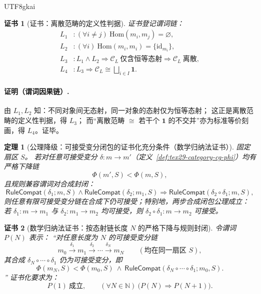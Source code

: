 \documentclass[12pt]{article}
\newtheorem{theorem}{定理}[section]
\newtheorem{Certificate}{证书}[section]
\newcommand{\NN}{\mathbb{N}}
\begin{document}
\begin{CJK*}{UTF8}{gkai}
\begin{Certificate}[证书：离散范畴的定义性判据]
\label{cert:tex29-axL-downgraded-discrete}
证书登记谓词链：
\[
\begin{aligned}
  L_1 &: (\forall i\neq j)\ \mathrm{Hom}(m_i,m_j)=\varnothing,\\
  L_2 &: (\forall i)\ \mathrm{Hom}(m_i,m_i)=\{\mathrm{id}_{m_i}\},\\
  L_3 &: L_1\wedge L_2\Rightarrow \mathcal{C}_L\ \text{仅含恒等态射}\Rightarrow \mathcal{C}_L\ \text{离散},\\
  L_4 &: L_3\Rightarrow \mathcal{C}_L\cong \bigsqcup_{i\in I}\mathbf{1}.
\end{aligned}
\]
\end{Certificate}

\paragraph{证明（谓词因果链）.}
由 $L_1,L_2$ 知：不同对象间无态射，同一对象的态射仅为恒等态射；
这正是离散范畴的定义性判据，得 $L_3$；
而“离散范畴 $\cong$ 若干个 $\mathbf{1}$ 的不交并”亦为标准等价刻画，得 $L_4$。证毕。

\begin{theorem}[公理降级：可接受变分闭包的证书化充分条件（数学归纳法证书）]
\label{thm:tex29-axG-downgraded-closure}
固定扇区 $S$。
若对任意可接受变分 $\delta:m\to m'$（定义~\ref{def:tex29-category-cg-phi}）均有严格下降链
\[
  \Phi(m',S)<\Phi(m,S),
\]
且规则兼容谓词对合成封闭：
\[
  \mathsf{RuleCompat}(\delta_1;m,S)\wedge \mathsf{RuleCompat}(\delta_2;m_1,S)
  \Rightarrow
  \mathsf{RuleCompat}(\delta_2\circ\delta_1;m,S),
\]
则任意有限可接受变分链在合成下仍可接受；特别地，两步合成闭包公理成立：
若 $\delta_1:m\to m_1$ 与 $\delta_2:m_1\to m_2$ 均可接受，则 $\delta_2\circ\delta_1:m\to m_2$ 可接受。
\end{theorem}

\begin{Certificate}[数学归纳法证书：按态射链长度 $N$ 的严格下降与规则封闭]
\label{cert:tex29-axG-downgraded-closure}
令谓词 $P(N)$ 表示：
“对任意长度为 $N$ 的可接受变分链
\[
  m_0\xrightarrow{\delta_1} m_1\xrightarrow{\delta_2}\cdots\xrightarrow{\delta_N} m_N
  \qquad(\text{均在同一扇区 }S),
\]
其合成 $\delta_N\circ\cdots\circ\delta_1$ 仍为可接受变分，即
\[
  \Phi(m_N,S)<\Phi(m_0,S)\ \wedge\ \mathsf{RuleCompat}(\delta_N\circ\cdots\circ\delta_1;m_0,S).
\]
”
证书化要求为：
\[
  P(1)\ \text{成立},\qquad (\forall N\in\NN)\ \bigl(P(N)\Rightarrow P(N+1)\bigr).
\]
\end{Certificate}


\end{CJK*}
\end{document}
